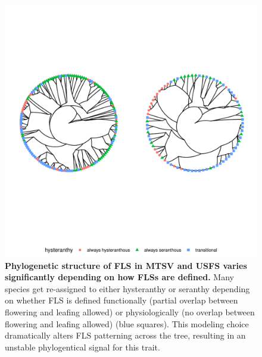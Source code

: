 \documentclass[12pt]{article}\usepackage[]{graphicx}\usepackage[]{color}
\begin{document}
\begin{figure}[H]

\includegraphics[width=7.5in]{figure/Code_chunk_Minimal_example3-1} 

   
  \caption{\textbf{Phylogenetic structure of FLS in MTSV and USFS varies significantly depending on how FLSs are defined.} Many species get re-assigned to either hysteranthy or seranthy depending on whether FLS is defined functionally (partial overlap between flowering and leafing allowed) or physiologically (no overlap between flowering and leafing allowed) (blue squares). This modeling choice dramatically alters FLS patterning across the tree, resulting in an unstable phylogentical signal for this trait.}
    \label{fig:Figure S1}
    \end{figure}
    \pagebreak

\end{document}
